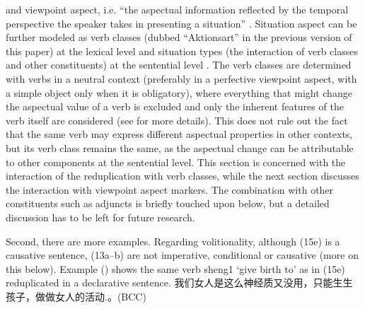 \documentclass[fleqn,twoside]{article}
\begin{document}
{and viewpoint aspect, i.e. ``the aspectual information reflected by the temporal perspective the speaker takes in presenting a situation'' \citep[21]{XiaoMcEnery2004}.
Situation aspect can be further modeled as verb classes (dubbed ``Aktionsart'' in the previous version of this paper) at the lexical level
and situation types (the interaction of verb classes and other constituents) at the sentential level \citep[33]{XiaoMcEnery2004}.
The verb classes are determined with verbs in a neutral context (preferably in a perfective viewpoint aspect, with a simple object only when it is obligatory), 
where everything that might change the aspectual value of a verb is excluded
and only the inherent features of the verb itself are considered
(see \citealt[52]{XiaoMcEnery2004} for more details).
This does not rule out the fact that the same verb may express different aspectual properties in other contexts,
but its verb class remains the same,
as the aspectual change can be attributable to other components at the sentential level.
This section is concerned with the interaction of the reduplication with verb classes,
while the next section discusses the interaction with viewpoint aspect markers.
The combination with other constituents such as adjuncts is briefly touched upon below,
but a detailed discussion has to be left for future research.

Second, there are more examples.
Regarding volitionality, although (15e) is a causative sentence, (13a--b) are not imperative, conditional or causative (more on this below).
Example () shows the same verb sheng1 `give birth to' as in (15e) reduplicated in a declarative sentence.
我们女人是这么神经质又没用，只能生生孩子，做做女人的活动.。(BCC)

}
\end{document}
